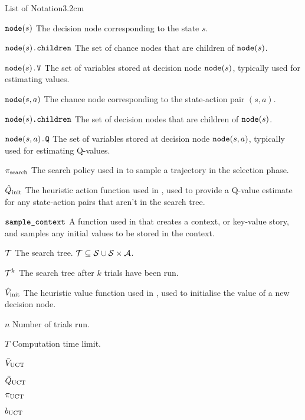 \begin{mclistof}{List of Notation}{3.2cm}
    \item[${\textnormal{\texttt{node}}}(s)$] 
        The decision node corresponding to the state $s$.
    \item[${\textnormal{\texttt{node}}}(s){\textnormal{\texttt{.children}}}$]
        The set of chance nodes that are children of ${\textnormal{\texttt{node}}}(s)$.
    \item[${{\textnormal{\texttt{node}}}(s)\textnormal{\texttt{.V}}}$]
        The set of variables stored at decision node ${\textnormal{\texttt{node}}}(s)$, typically used for estimating values.
    \item[${\textnormal{\texttt{node}}}(s,a)$] 
        The chance node corresponding to the state-action pair $(s,a)$.
    \item[${\textnormal{\texttt{node}}}(s){\textnormal{\texttt{.children}}}$]
        The set of decision nodes that are children of ${\textnormal{\texttt{node}}}(s)$.
    \item[${{\textnormal{\texttt{node}}}(s,a)\textnormal{\texttt{.Q}}}$] 
        The set of variables stored at decision node ${\textnormal{\texttt{node}}}(s,a)$, typically used for estimating Q-values.
    \item[${\pi_{\textnormal{search}}}$]
        The search policy used in \thtspp\ewe to sample a trajectory in the selection phase.
    \item[${\hat{Q}_{\textnormal{init}}}$]
        The heuristic action function used in \thtspp, used to provide a Q-value estimate for any state-action pairs that aren't in the search tree.
    \item[${\textnormal{\texttt{sample\_context}}}$]
        A function used in \thtspp\ewe that creates a context, or key-value story, and samples any initial values to be stored in the context.
    \item[$\mathcal{T}$] 
        The \thtspp\ewe search tree. $\mathcal{T}\subseteq \mathcal{S} \cup \mathcal{S}\times\mathcal{A}$. 
    \item[$\mathcal{T}^k$] 
        The \thtspp\ewe search tree after $k$ trials have been run.
    \item[${\hat{V}_{\textnormal{init}}}$]
        The heuristic value function used in \thtspp, used to initialise the value of a new decision node.

    \item[] 
    
    \item[$n$] 
        Number of trials run.
    \item[$T$] 
        Computation time limit.

    \item[${\bar{V}_{{\textnormal{UCT}}}}$] 
    \item[${\bar{Q}_{{\textnormal{UCT}}}}$] 
    \item[${\pi_{{\textnormal{UCT}}}}$] 
    \item[$b_{{\textnormal{UCT}}}$] 


\end{mclistof}

